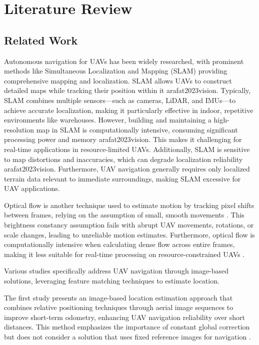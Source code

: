 
\chapter{Literature Review}



\section{Related Work}


Autonomous navigation for UAVs has been widely researched, with prominent methods like Simultaneous Localization and Mapping (SLAM) providing comprehensive mapping and localization. SLAM allows UAVs to construct detailed maps while tracking their position within it {arafat2023vision}. Typically, SLAM combines multiple sensors—such as cameras, LiDAR, and IMUs—to achieve accurate localization, making it particularly effective in indoor, repetitive environments like warehouses. However, building and maintaining a high-resolution map in SLAM is computationally intensive, consuming significant processing power and memory {arafat2023vision}. This makes it challenging for real-time applications in resource-limited UAVs. Additionally, SLAM is sensitive to map distortions and inaccuracies, which can degrade localization reliability {arafat2023vision}. Furthermore, UAV navigation generally requires only localized terrain data relevant to immediate surroundings, making SLAM excessive for UAV applications.

Optical flow is another technique used to estimate motion by tracking pixel shifts between frames, relying on the assumption of small, smooth movements \cite{odonovan2005optical}. This brightness constancy assumption fails with abrupt UAV movements, rotations, or scale changes, leading to unreliable motion estimates. Furthermore, optical flow is computationally intensive when calculating dense flow across entire frames, making it less suitable for real-time processing on resource-constrained UAVs \cite{barnum2003practical}.

Various studies specifically address UAV navigation through image-based solutions, leveraging feature matching techniques to estimate location.

The first study presents an image-based location estimation approach that combines relative positioning techniques through aerial image sequences to improve short-term odometry, enhancing UAV navigation reliability over short distances. This method emphasizes the importance of constant global correction but does not consider a solution that uses fixed reference images for navigation \cite{sim2002integrated}.

